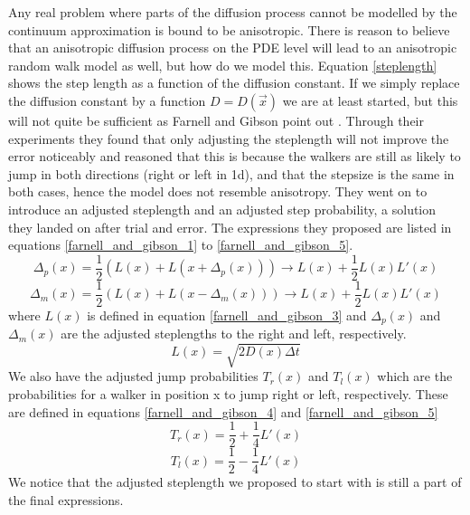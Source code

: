 Any real problem where parts of the diffusion process cannot be modelled by the continuum approximation is bound to be anisotropic. 
There is reason to believe that an anisotropic diffusion process on the PDE level will lead to an anisotropic random walk model as well, but how do we model this. 
Equation \ref{steplength} shows the step length as a function of the diffusion constant. 
If we simply replace the diffusion constant by a function $D = D(\vec{x})$ we are at least started, but this will not quite be sufficient as Farnell and Gibson point out \cite{farnell2005monte}. 
Through their experiments they found that only adjusting the steplength will not improve the error noticeably and reasoned that this is because the walkers are still as likely to jump in both directions (right or left in 1d), and that the stepsize is the same in both cases, hence the model does not resemble anisotropy. 
They went on to introduce an adjusted steplength and an adjusted step probability, a solution they landed on after trial and error. 
The expressions they proposed are listed in equations \ref{farnell_and_gibson_1} to \ref{farnell_and_gibson_5}. 
\begin{equation}\label{farnell_and_gibson_1}
 \Delta_p(x) = \frac{1}{2}\left(L(x) + L(x +\Delta_p(x))\right) \to L(x) +\frac{1}{2}L(x)L'(x)
\end{equation}
\begin{equation}\label{farnell_and_gibson_2}
 \Delta_m(x) = \frac{1}{2}\left(L(x) + L(x -\Delta_m(x))\right) \to L(x) +\frac{1}{2}L(x)L'(x)
\end{equation}
where $L(x)$ is defined in equation \ref{farnell_and_gibson_3} and $\Delta_p(x)$ and $\Delta_m(x)$ are the adjusted steplengths to the right and left, respectively.
\begin{equation}\label{farnell_and_gibson_3}
L(x) = \sqrt{2D(x)\Delta t}
\end{equation}
We also have the adjusted jump probabilities $T_r(x)$ and $T_l(x)$ which are the probabilities for a walker in position x to jump right or left, respectively. 
These are defined in equations \ref{farnell_and_gibson_4} and \ref{farnell_and_gibson_5}
\begin{equation}\label{farnell_and_gibson_4}
T_r(x) = \frac{1}{2} +\frac{1}{4}L'(x)
\end{equation}
\begin{equation}\label{farnell_and_gibson_5}
T_l(x) = \frac{1}{2} -\frac{1}{4}L'(x)
\end{equation}
We notice that the adjusted steplength we proposed to start with is still a part of the final expressions.


